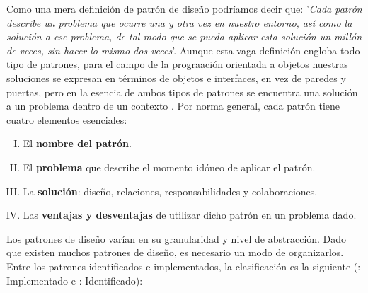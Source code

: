 \documentclass[../ei103948-project-documentation.tex]{subfiles}
\begin{document}
                Como una mera definición de patrón de diseño podríamos decir que: '\textit{Cada patrón describe un problema que ocurre una y otra vez en nuestro entorno, así como la solución a ese problema, de tal modo que se pueda aplicar esta solución un millón de veces, sin hacer lo mismo dos veces}'. Aunque esta vaga definición engloba todo tipo de patrones, para el campo de la prograación orientada a objetos nuestras soluciones se expresan en términos de objetos e interfaces, en vez de paredes y puertas, pero en la esencia de ambos tipos de patrones se encuentra una solución a un problema dentro de un contexto \cite{patronesdisenyo}. Por norma general, cada patrón tiene cuatro elementos esenciales:
                    \begin{enumerate}[I)]
                        \item El \textbf{nombre del patrón}.
                        \item El \textbf{problema} que describe el momento idóneo de aplicar el patrón.
                        \item La \textbf{solución}: diseño, relaciones, responsabilidades y colaboraciones.
                        \item Las \textbf{ventajas y desventajas} de utilizar dicho patrón en un problema dado.
                    \end{enumerate}
            
                Los patrones de diseño varían en su granularidad y nivel de abstracción. Dado que existen muchos patrones de diseño, es necesario un modo de organizarlos. Entre los patrones identificados e implementados, la clasificación es la siguiente (: Implementado e : Identificado):
                    
\end{document}

